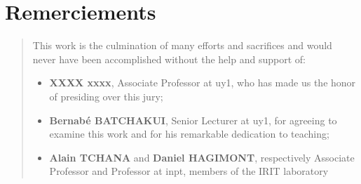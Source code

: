 %
%
%
%
%
%
\chapter*{Remerciements}
\begin{SingleSpace}
\begin{quote}
This work is the culmination of many efforts and sacrifices and would never have been accomplished without the help and support of:

\begin{itemize}
	\item \textbf{XXXX xxxx}, Associate Professor at \acrshort{uy1}, who has made us the honor of presiding over this jury;
    \item \textbf{Bernab\'{e} BATCHAKUI}, Senior Lecturer at \acrshort{uy1}, for agreeing to examine this work and for his remarkable dedication to teaching;
    \item \textbf{Alain TCHANA} and \textbf{Daniel HAGIMONT}, respectively Associate Professor and Professor at \acrshort{inpt}, members of the IRIT laboratory 

    
\end{itemize}

\end{quote}
\end{SingleSpace}
\clearpage
